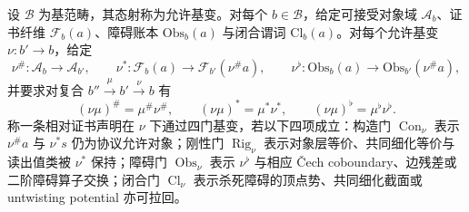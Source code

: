 \begin{definition}[相对证书的四门基变账本]\label{distill:grothendieck-relative_certificate_base_change_stability-four-gate-certificate-ledger}
设 \(\mathcal B\) 为基范畴，其态射称为允许基变。对每个 \(b\in\mathcal B\)，给定可接受对象域 \(\mathcal A_b\)、证书纤维 \(\mathscr F_b(a)\)、障碍账本 \(\mathrm{Obs}_b(a)\) 与闭合谓词 \(\mathrm{Cl}_b(a)\)。对每个允许基变 \(\nu:b'\to b\)，给定
\[
\nu^\#:\mathcal A_b\to\mathcal A_{b'},\qquad
\nu^*:\mathscr F_b(a)\to\mathscr F_{b'}(\nu^\#a),
\qquad
\nu^\flat:\mathrm{Obs}_b(a)\to\mathrm{Obs}_{b'}(\nu^\#a),
\]
并要求对复合 \(b''\xrightarrow{\mu}b'\xrightarrow{\nu}b\) 有
\[
(\nu\mu)^\#=\mu^\#\nu^\#,\qquad
(\nu\mu)^*=\mu^*\nu^*,\qquad
(\nu\mu)^\flat=\mu^\flat\nu^\flat .
\]
称一条相对证书声明在 \(\nu\) 下通过四门基变，若以下四项成立：构造门 \(\operatorname{Con}_\nu\) 表示 \(\nu^\#a\) 与 \(\nu^*s\) 仍为协议允许对象；刚性门 \(\operatorname{Rig}_\nu\) 表示对象层等价、共同细化等价与读出值类被 \(\nu^*\) 保持；障碍门 \(\operatorname{Obs}_\nu\) 表示 \(\nu^\flat\) 与相应 \v{C}ech coboundary、边残差或二阶障碍算子交换；闭合门 \(\operatorname{Cl}_\nu\) 表示杀死障碍的顶点势、共同细化截面或 untwisting potential 亦可拉回。
\end{definition}

